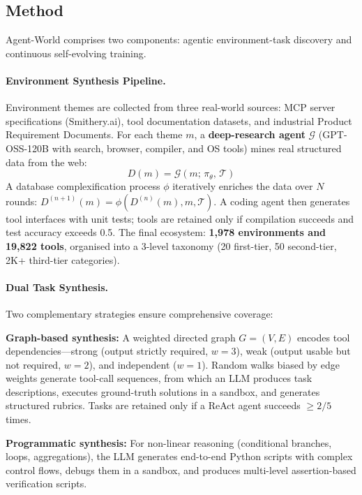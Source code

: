 \documentclass[11pt]{article}
\begin{document}
\subsection{Method}

Agent-World comprises two components: agentic environment-task discovery and continuous self-evolving training.

\paragraph{Environment Synthesis Pipeline.}
Environment themes are collected from three real-world sources: MCP server specifications (Smithery.ai), tool documentation datasets, and industrial Product Requirement Documents. For each theme $m$, a \textbf{deep-research agent} $\mathcal{G}$ (GPT-OSS-120B with search, browser, compiler, and OS tools) mines real structured data from the web:
\begin{equation}
    D(m) = \mathcal{G}(m;\, \pi_\theta,\, \mathcal{T})
\end{equation}
A database complexification process $\phi$ iteratively enriches the data over $N$ rounds: $D^{(n+1)}(m) = \phi(D^{(n)}(m), m, \mathcal{T})$. A coding agent then generates tool interfaces with unit tests; tools are retained only if compilation succeeds and test accuracy exceeds 0.5. The final ecosystem: \textbf{1,978 environments and 19,822 tools}, organised into a 3-level taxonomy (20 first-tier, 50 second-tier, 2K+ third-tier categories).

\paragraph{Dual Task Synthesis.}
Two complementary strategies ensure comprehensive coverage:

\textbf{Graph-based synthesis:} A weighted directed graph $G = (V, E)$ encodes tool dependencies---strong (output strictly required, $w = 3$), weak (output usable but not required, $w = 2$), and independent ($w = 1$). Random walks biased by edge weights generate tool-call sequences, from which an LLM produces task descriptions, executes ground-truth solutions in a sandbox, and generates structured rubrics. Tasks are retained only if a ReAct agent succeeds $\geq 2/5$ times.

\textbf{Programmatic synthesis:} For non-linear reasoning (conditional branches, loops, aggregations), the LLM generates end-to-end Python scripts with complex control flows, debugs them in a sandbox, and produces multi-level assertion-based verification scripts.
\end{document}
